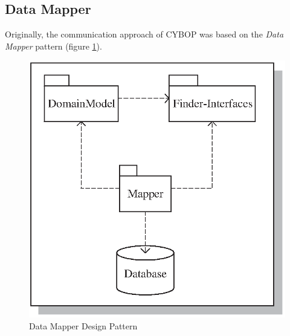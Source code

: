 %
%
%
%
%
%
%

\subsection{Data Mapper}
\label{data_mapper_heading}

Originally, the communication approach of CYBOP was based on the
\emph{Data Mapper} pattern (figure \ref{data_mapper_figure}).
\begin{figure}[ht]
    \begin{center}
       \includegraphics[scale=0.6]{vector/data_mapper.eps}
       \caption{Data Mapper Design Pattern \cite{fowler2002}}
       \label{data_mapper_figure}
    \end{center}
\end{figure}

